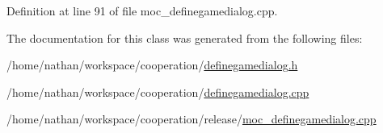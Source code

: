 Definition at line 91 of file moc\_\-definegamedialog.cpp.



The documentation for this class was generated from the following files:\begin{DoxyCompactItemize}
\item 
/home/nathan/workspace/cooperation/\hyperlink{definegamedialog_8h}{definegamedialog.h}\item 
/home/nathan/workspace/cooperation/\hyperlink{definegamedialog_8cpp}{definegamedialog.cpp}\item 
/home/nathan/workspace/cooperation/release/\hyperlink{moc__definegamedialog_8cpp}{moc\_\-definegamedialog.cpp}\end{DoxyCompactItemize}
